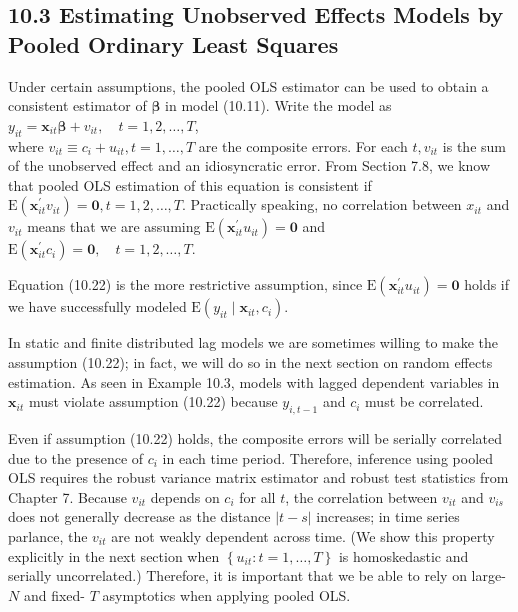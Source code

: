 \documentclass[10pt]{article}
\begin{document}
\subsection*{10.3 Estimating Unobserved Effects Models by Pooled Ordinary Least Squares}
Under certain assumptions, the pooled OLS estimator can be used to obtain a consistent estimator of $\boldsymbol{\beta}$ in model (10.11). Write the model as\\
$y_{i t}=\mathbf{x}_{i t} \boldsymbol{\beta}+v_{i t}, \quad t=1,2, \ldots, T$,\\
where $v_{i t} \equiv c_{i}+u_{i t}, t=1, \ldots, T$ are the composite errors. For each $t, v_{i t}$ is the sum of the unobserved effect and an idiosyncratic error. From Section 7.8, we know that pooled OLS estimation of this equation is consistent if $\mathrm{E}\left(\mathbf{x}_{i t}^{\prime} v_{i t}\right)=\mathbf{0}, t=1,2, \ldots, T$. Practically speaking, no correlation between $x_{i t}$ and $v_{i t}$ means that we are assuming $\mathrm{E}\left(\mathbf{x}_{i t}^{\prime} u_{i t}\right)=\mathbf{0}$ and\\
$\mathrm{E}\left(\mathbf{x}_{i t}^{\prime} c_{i}\right)=\mathbf{0}, \quad t=1,2, \ldots, T$.

Equation (10.22) is the more restrictive assumption, since $\mathrm{E}\left(\mathbf{x}_{i t}^{\prime} u_{i t}\right)=\mathbf{0}$ holds if we have successfully modeled $\mathrm{E}\left(y_{i t} \mid \mathbf{x}_{i t}, c_{i}\right)$.

In static and finite distributed lag models we are sometimes willing to make the assumption (10.22); in fact, we will do so in the next section on random effects estimation. As seen in Example 10.3, models with lagged dependent variables in $\mathbf{x}_{i t}$ must violate assumption (10.22) because $y_{i, t-1}$ and $c_{i}$ must be correlated.

Even if assumption (10.22) holds, the composite errors will be serially correlated due to the presence of $c_{i}$ in each time period. Therefore, inference using pooled OLS requires the robust variance matrix estimator and robust test statistics from Chapter 7. Because $v_{i t}$ depends on $c_{i}$ for all $t$, the correlation between $v_{i t}$ and $v_{i s}$ does not generally decrease as the distance $|t-s|$ increases; in time series parlance, the $v_{i t}$ are not weakly dependent across time. (We show this property explicitly in the next section when $\left\{u_{i t}: t=1, \ldots, T\right\}$ is homoskedastic and serially uncorrelated.) Therefore, it is important that we be able to rely on large- $N$ and fixed- $T$ asymptotics when applying pooled OLS.
\end{document}
